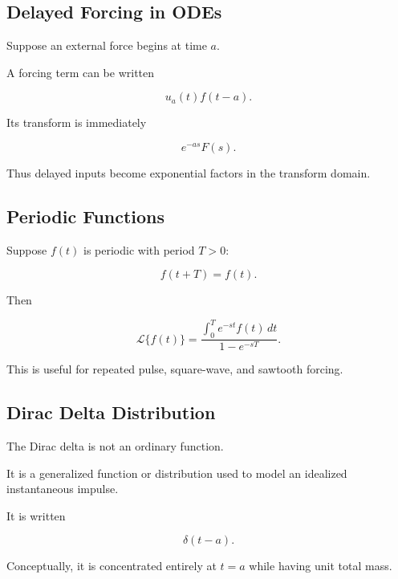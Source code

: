 \subsection{Delayed Forcing in ODEs}
\label{subsec:delayed-forcing-odes}

Suppose an external force begins at time \(a\).

A forcing term can be written

\[
\boxed{
u_a(t)f(t-a).
}
\]

Its transform is immediately

\[
\boxed{
e^{-as}F(s).
}
\]

Thus delayed inputs become exponential factors in the transform domain.

\subsection{Periodic Functions}
\label{subsec:laplace-periodic-functions}

Suppose \(f(t)\) is periodic with period \(T>0\):

\[
f(t+T)=f(t).
\]

Then

\[
\boxed{
\mathcal{L}\{f(t)\}
=
\frac{
\displaystyle
\int_0^T
e^{-st}f(t)\,dt
}{
1-e^{-sT}
}.
}
\]

This is useful for repeated pulse, square-wave, and sawtooth forcing.

\subsection{Dirac Delta Distribution}
\label{subsec:dirac-delta}

The Dirac delta is not an ordinary function.

It is a generalized function or distribution used to model an idealized
instantaneous impulse.

It is written

\[
\boxed{
\delta(t-a).
}
\]

Conceptually, it is concentrated entirely at \(t=a\) while having unit
total mass.

